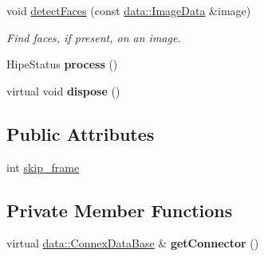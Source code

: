 \begin{DoxyCompactItemize}
void \hyperlink{classfilter_1_1algos_1_1_face_detection_a48cb8617d71a9827857e3d2d1e61b3f7}{detect\+Faces} (const \hyperlink{classfilter_1_1data_1_1_image_data}{data\+::\+Image\+Data} \&image)
\begin{DoxyCompactList}\small\item\em Find faces, if present, on an image. \end{DoxyCompactList}\item 
\mbox{\label{classfilter_1_1algos_1_1_face_detection_aef784726620f237ae8988a02a8e5b16c}} 
Hipe\+Status {\bfseries process} ()
\item 
\mbox{\label{classfilter_1_1algos_1_1_face_detection_a1d26de7e9a421f68818995e1067a49c4}} 
virtual void {\bfseries dispose} ()
\end{DoxyCompactItemize}
\subsection*{Public Attributes}
\begin{DoxyCompactItemize}
\item 
int \hyperlink{classfilter_1_1algos_1_1_face_detection_a2dcb3e622ff24852e0c81beea2dc7681}{skip\+\_\+frame}
\end{DoxyCompactItemize}
\subsection*{Private Member Functions}
\begin{DoxyCompactItemize}
\item 
\mbox{\label{classfilter_1_1algos_1_1_face_detection_a10ff45a1998523542d6b96a2ed126240}} 
virtual \hyperlink{classfilter_1_1data_1_1_connex_data_base}{data\+::\+Connex\+Data\+Base} \& {\bfseries get\+Connector} ()
\end{DoxyCompactItemize}
